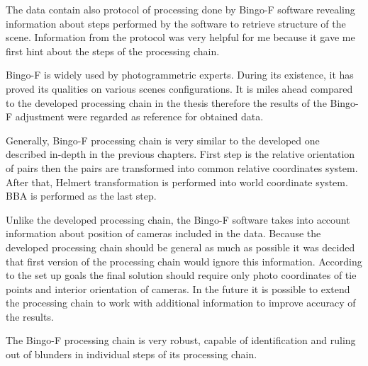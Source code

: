 \documentclass[a4paper,12pt]{article}
\begin{document}
The data contain also protocol of processing done by Bingo-F software \cite{bingo2013gip} revealing 
information about steps performed by the software to retrieve structure of the scene.
Information from the protocol was very helpful for me because 
it gave me first hint about the steps of the processing chain.

Bingo-F is widely used by photogrammetric experts. During its existence, it has proved its qualities on various scenes configurations.  
It is miles ahead compared to the developed processing chain in the thesis therefore the results of the Bingo-F adjustment were 
regarded as reference for obtained data.

Generally, Bingo-F processing chain is very similar to the developed  one  
described in-depth in the previous chapters. First step is the relative orientation of pairs then the pairs are transformed into common relative 
coordinates system. After that, Helmert transformation is performed into world coordinate system. BBA is performed as the last step.

Unlike the developed processing chain, the Bingo-F software takes into account information about position of cameras included in the data. 
Because the developed processing chain should be general as much as possible it was decided that first version of the processing chain would ignore this 
information. According to the set up goals the final solution should require only photo coordinates of tie points and interior 
orientation of cameras. In the future it is possible to extend the processing chain to work with additional information to improve accuracy 
of the results. 

The Bingo-F processing chain is very robust,
capable of identification and ruling out of blunders in individual steps of its processing chain.
\end{document}
